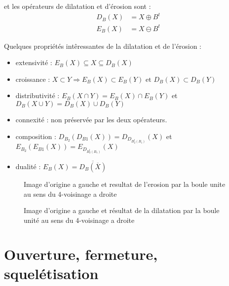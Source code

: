\documentclass[10pt,a4paper]{article}
\begin{document}
et les op\'{e}rateurs de dilatation et d'\'{e}rosion sont :
\begin{align*}	
	D_{B}\left(X\right) &= X\oplus B^t	\\
	E_{B}\left(X\right) &= X\ominus B^t
\end{align*}


Quelques propri\'{e}t\'{e}s int\^{e}ressantes de la dilatation et de l'\'{e}rosion : 
\begin{itemize}
	\item extensivit\'{e} : $E_B\left(X\right) \subseteq X \subseteq D_B\left(X\right)$ 
	\item croissance : $X\subset Y \Rightarrow E_B\left(X\right) \subset E_B\left(Y\right) \text{ et } D_B\left(X\right) \subset D_B\left(Y\right)$
	\item distributivit\'{e} : $E_B\left(X\cap Y\right) = E_B\left(X\right) \cap E_B\left(Y\right)$ et $D_B\left(X\cup Y\right) = D_B\left(X\right) \cup D_B\left(Y\right)$
	\item connexit\'{e} : non pr\'{e}serv\'{e}e par les deux op\'{e}rateurs.
	\item composition : $D_{B_2}\left(D_{B1}\left(X\right)\right) = D_{D_{B_{2}^{t}\left(B_1\right)}}\left(X\right)$ et  $E_{B_2}\left(E_{B1}\left(X\right)\right) = E_{D_{B_{2}^{t}\left(B_1\right)}}\left(X\right)$ 
	\item dualit\'{e} : $ E_B\left(X\right) = \overline{ D_B\left(\overline{X}\right)}$
\end{itemize}

\begin{figure}[h]
	\centering
\scalebox{0.45}{}\scalebox{0.45}{}
	\caption{Image d'origine a gauche et resultat de l'erosion par la boule unite au sens du 4-voisinage a droite}
	\label{erosion}
\end{figure}

\begin{figure}[h]
	\centering
	\scalebox{0.45}{}\scalebox{0.45}{}
	\caption{Image d'origine a gauche et r\'{e}sultat de la dilatation par la boule unit\'{e} au sens du 4-voisinage a droite}
	\label{dilatation}
\end{figure}




\clearpage
\section{Ouverture, fermeture, squel\'{e}tisation}
\end{document}
